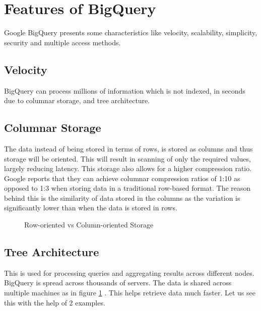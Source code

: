 \documentclass[9pt,twocolumn,twoside]{../../styles/osajnl}
\begin{document}
\section{Features of BigQuery}
Google BigQuery\cite{www-bigquery}
presents some characteristics like velocity,
scalability, simplicity, security and multiple access methods.

\subsection{Velocity}

BigQuery\cite{www-bigquery}
can process millions of information which
is not indexed, in seconds due to columnar storage, and tree
architecture.

\subsection{Columnar Storage}
The data instead of being stored in terms of rows, is stored as
columns and thus storage will be oriented. This will result in
scanning of only the required values, largely reducing latency. This
storage also allows for a higher compression ratio. Google reports
\cite{www-rowvscolumnstorage} that they can achieve columnar
compression ratios of 1:10 as opposed to 1:3 when storing data in a
traditional row-based format. The reason behind this is the similarity
of data stored in the columns as the variation is significantly lower
than when the data is stored in rows.

\begin{figure}[htbp]
\centering
{}
\caption{\cite{www-rowvscolumnstorage} Row-oriented vs Column-oriented Storage}
\label{fig:rowvscolumnarstorage}
\end{figure}

\subsection{Tree Architecture}
This is used for processing queries and aggregating results across
different nodes. BigQuery is spread across thousands of servers. The
data is shared across multiple machines as in figure
\ref{fig:rowvscolumnarstorage}
. This helps retrieve data much
faster. Let us see this with the help of 2
examples\cite{www-rowvscolumnstorage}.
\end{document}
